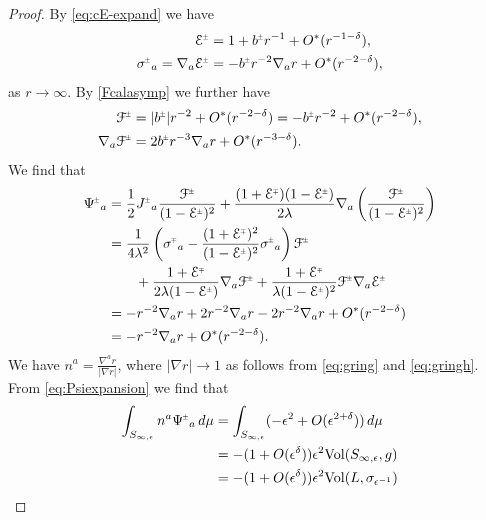 \documentclass[a4paper,10pt,reqno]{amsart}
\newcommand{\cE}{\mathcal{E}}
\theoremstyle{plain}
\newcommand{\PM}[1]{{{#1}^{\hspace{-.5pt}\scaleto{\pm}{3.5pt}}}}
\newcommand{\MP}[1]{{{#1}^{\hspace{-.5pt}\scaleto{\mp}{3.5pt}}}}
\newcommand{\eps}{\epsilon}
\def\Fcal{\mathcal{F}}
\def\Ecal{\mathcal{E}}
\numberwithin{equation}{section}
\begin{document}
\begin{proof} 
By \eqref{eq:cE-expand} we have
\begin{align}
\PM{\cE} &= 1 + \PM{b} r^{-1} + O^*(r^{-1- \delta}), \nonumber \\
\PM{\sigma}_{a} = \nabla_a \PM{\cE}
&= -\PM{b} r^{-2} \nabla_a r + O^*(r^{-2- \delta}),
\end{align}
as $r \to \infty$. By \eqref{Fcalasymp} we further have 
\begin{align}
\PM{\Fcal}
&=|\PM{b}| r^{-2} + O^*(r^{-2-\delta})
=-\PM{b} r^{-2} + O^*(r^{-2-\delta}), \nonumber \\
\nabla_a \PM{\Fcal}
&= 2\PM{b} r^{-3} \nabla_a r + O^*(r^{-3-\delta}).
\end{align}
We find that
\begin{align}
\PM{\Psi}_a
&=
\frac{1}{2} \PM{J}_a \frac{\PM{\Fcal}}{(1-\PM{\Ecal})^2}
+ \frac{(1 + \MP{\Ecal}) (1 -  \PM{\Ecal})}{2\lambda}
\nabla_a \left(\frac{\PM{\Fcal}}{(1-\PM{\Ecal})^2} \right)\nonumber \\
&=
\frac{1}{4 \lambda^2} \left(
\MP{\sigma}_{a} - \frac{(1 + \MP{\Ecal})^2}{(1 - \PM{\Ecal})^2} \PM{\sigma}_{a}
\right) \PM{\Fcal} \nonumber \\
&\qquad
+ \frac{1 + \MP{\Ecal}}{2\lambda(1-\PM{\Ecal})}
\nabla_a \PM{\Fcal}
+ \frac{1 + \MP{\Ecal}}{\lambda(1-\PM{\Ecal})^2}
\PM{\Fcal} \nabla_a \PM{\cE} \nonumber \\
&=
- r^{-2} \nabla_a r + 2r^{-2} \nabla_a r - 2r^{-2} \nabla_a r + O^*(r^{-2-\delta})\nonumber \\
&=
- r^{-2} \nabla_a r + O^*(r^{-2-\delta}) \label{eq:Psiexpansion}.
\end{align}
We have 
$n^a=\frac{\nabla^a r}{|\nabla r|}$, where $|\nabla r| \to 1$ as follows from \eqref{eq:gring} and \eqref{eq:gringh}. From \eqref{eq:Psiexpansion} we find that 
\begin{align}
\int_{S_{\infty,\epsilon}} n^a\PM{\Psi}_a \, d\mu
&= \int_{S_{\infty,\epsilon}}(-\eps^2 + O(\eps^{2 + \delta})) \, d\mu \nonumber \\
&= - (1 + O(\eps^{\delta})) \eps^2 \mathrm{Vol}(S_{\infty,\epsilon},g) \nonumber \\
&= - (1 + O(\eps^{\delta})) \eps^2 \mathrm{Vol}(L, \sigma_{\eps^{-1}}) %
\end{align}


\end{proof}
\end{document}
